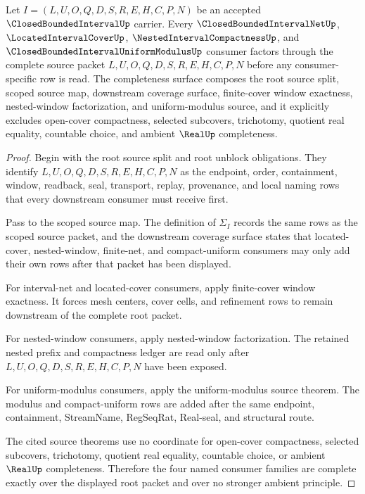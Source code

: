 \begin{theorem}
\label{thm:closed-bounded-interval-root-consumer-completeness}
Let $I=(L,U,O,Q,D,S,R,E,H,C,P,N)$ be an accepted $\ClosedBoundedIntervalUp$ carrier. Every $\ClosedBoundedIntervalNetUp$, $\LocatedIntervalCoverUp$, $\NestedIntervalCompactnessUp$, and $\ClosedBoundedIntervalUniformModulusUp$ consumer factors through the complete source packet $L,U,O,Q,D,S,R,E,H,C,P,N$ before any consumer-specific row is read. The completeness surface composes the root source split, scoped source map, downstream coverage surface, finite-cover window exactness, nested-window factorization, and uniform-modulus source, and it explicitly excludes open-cover compactness, selected subcovers, trichotomy, quotient real equality, countable choice, and ambient $\RealUp$ completeness.
\end{theorem}
\begin{proof}
Begin with the root source split and root unblock obligations. They identify $L,U,O,Q,D,S,R,E,H,C,P,N$ as the endpoint, order, containment, window, readback, seal, transport, replay, provenance, and local naming rows that every downstream consumer must receive first.

Pass to the scoped source map. The definition of $\Sigma_I$ records the same rows as the scoped source packet, and the downstream coverage surface states that located-cover, nested-window, finite-net, and compact-uniform consumers may only add their own rows after that packet has been displayed.

For interval-net and located-cover consumers, apply finite-cover window exactness. It forces mesh centers, cover cells, and refinement rows to remain downstream of the complete root packet.

For nested-window consumers, apply nested-window factorization. The retained nested prefix and compactness ledger are read only after $L,U,O,Q,D,S,R,E,H,C,P,N$ have been exposed.

For uniform-modulus consumers, apply the uniform-modulus source theorem. The modulus and compact-uniform rows are added after the same endpoint, containment, StreamName, RegSeqRat, Real-seal, and structural route.

The cited source theorems use no coordinate for open-cover compactness, selected subcovers, trichotomy, quotient real equality, countable choice, or ambient $\RealUp$ completeness. Therefore the four named consumer families are complete exactly over the displayed root packet and over no stronger ambient principle.
\end{proof}

